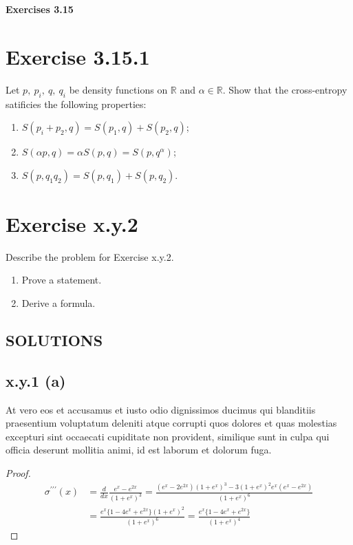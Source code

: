\documentclass{exam}
\begin{document}
\begin{center}
    \textbf{\Large Exercises 3.15 }
\end{center}

\section*{Exercise 3.15.1}
Let $p, \ p_i, \ q, \ q_i$ be density functions on $\mathbb{R}$ and $\alpha \in \mathbb{R}$. Show that the cross-entropy satificies the following properties:
\begin{enumerate}
    \item $S(p_i + p_2,q) = S(p_1,q) + S(p_2,q)$;
    \item $S(\alpha p,q) = \alpha S(p,q) = S(p,q^{\alpha})$;
    \item $S(p, q_1 q_2) = S(p,q_1) + S(p,q_2)$.
\end{enumerate}

\section*{Exercise x.y.2}
 Describe the problem for Exercise x.y.2.
\begin{enumerate}
    \item Prove a statement.
    \item Derive a formula.
\end{enumerate}


\newpage

\begin{center}    
    \section*{SOLUTIONS}
\end{center}

\subsection*{x.y.1 (a)}
At vero eos et accusamus et iusto odio dignissimos ducimus qui blanditiis praesentium voluptatum deleniti atque corrupti quos 
dolores et quas molestias excepturi sint occaecati cupiditate non provident, similique sunt in culpa qui officia deserunt mollitia animi, 
id est laborum et dolorum fuga.
\begin{proof}
    \begin{equation*}     
        \begin{aligned}
            \sigma^{\prime\prime\prime}(x) &= \frac{d}{ d x} \frac{e^{x}-e^{2x}}{(1 + e^{x})^3} = \frac{(e^x - 2e^{2x})(1 + e^x)^3 - 3(1 + e^x)^2 e^{x}(e^x - e^{2x})}{(1 + e^x)^6}\\
            &= \frac{e^{x} \{ 1 - 4e^x + e^{2x} \}(1 + e^x)^2}{(1 + e^x)^{6}} = \frac{e^{x} \{ 1 - 4e^x + e^{2x} \}}{(1 + e^x)^{4}}
        \end{aligned}
\end{equation*}
\end{proof}
\end{document}
